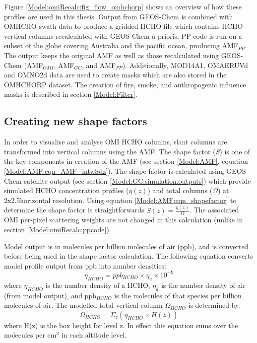     
    Figure \ref{Model:omiRecalc:fig_flow_omhchorp} shows an overview of how these profiles are used in this thesis.
    Output from GEOS-Chem is combined with OMHCHO swath data to produce a gridded HCHO file which contains HCHO vertical columns recalculated with GEOS-Chem a prioris.
    PP code is run on a subset of the globe covering Australia and the pacific ocean, producing AMF$_{PP}$.
    The output keeps the original AMF as well as those recalculated using GEOS-Chem (AMF$_{OMI}$, AMF$_{GC}$, and AMF$_{PP}$).
    Additionally, MOD14A1, OMAERUVd and OMNO2d data are used to create masks which are also stored in the OMHCHORP dataset.
    The creation of fire, smoke, and anthropogenic influence masks is described in section \ref{Model:Filter}.
    
      
    
  \subsection{Creating new shape factors}
    In order to visualise and analyse OMI HCHO columns, slant columns are transformed into vertical columns using the AMF.
    The shape factor (\textit{S}) is one of the key components in creation of the AMF (see section \ref{Model:AMF}, equation \ref{Model:AMF:eqn_AMF_intwSdz}).
    The shape factor is calculated using GEOS-Chem satellite output (see section \ref{Model:GC:simulation:outputs}) which provide simulated HCHO concentration profiles ($\eta(z)$) and total columns ($\Omega$) at 2x2.5\degr horizontal resolution.
    Using equation \ref{Model:AMF:eqn_shapefactor} to determine the shape factor is straightforwards $S(z) = \frac{\eta(z)}{\Omega}$.
    The associated OMI per-pixel scattering weights are not changed in this calculation (unlike in section \ref{Model:omiRecalc:ppcode}).
    
    Model output is in molecules per billion molecules of air (ppb), and is converted before being used in the shape factor calculation.
    The following equation converts model profile output from ppb into number densities:
    \begin{equation} \label{Model:omiRecalc:eqn_ppb_to_n}
      \eta_{HCHO} = ppb_{HCHO} \times \eta_a \times 10^{-9}
    \end{equation}
    where $\eta_{HCHO}$ is the number density of a HCHO, $\eta_a$ is the number density of air (from model output), and ppb$_{HCHO}$ is the molecules of that species per billion molecules of air.
    The modelled total vertical column $\Omega_{HCHO}$ is determined by:
    \begin{equation*}
      \Omega_{HCHO} = \Sigma_z \left( \eta_{HCHO} \times H(z) \right)
    \end{equation*}
    where H(z) is the box height for level z.
    In effect this equation sums over the molecules per cm$^2$ in each altitude level.
    
